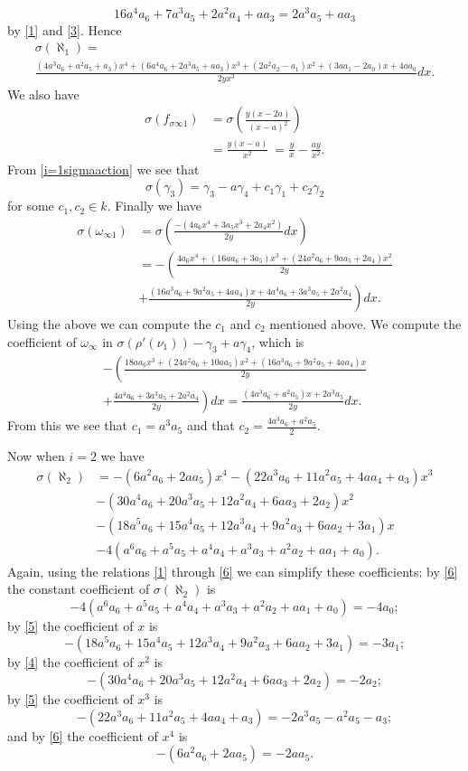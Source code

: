 \documentclass[draft, 11pt]{article} %
\theoremstyle{plain}
\theoremstyle{remark}
\begin{document}
\[
16a^4a_6+7a^3a_5+2a^2a_4+aa_3 = 2a^3a_5 +aa_3
\]
by \ref{1} and \ref{3}.
Hence
\begin{multline*}
\sigma(\aleph_1) = \\ \frac{(4a^3a_6+a^2a_5+a_3)x^4+(6a^4a_6+2a^3a_5+aa_3)x^3+(2a^2a_2-a_1)x^2+(3aa_1-2a_0)x+4aa_0}{2yx^3}dx.
\end{multline*}
We also have
\begin{align}\label{i=1sigmaaction}
\sigma(f_{\sigma \infty 1}) & = \sigma\left(\frac{y(x-2a)}{(x-a)^2} \right) \nonumber\\
& = \frac{y(x-a)}{x^2}  \
 = \frac{y}{x} - \frac{ay}{x^2}.
\end{align}
From \eqref{i=1sigmaaction} we see that
\begin{equation}\label{firstidentity}
\sigma(\gamma_3) = \gamma_3 - a\gamma_4 + c_1\gamma_1 + c_2 \gamma_2
\end{equation}
for some $c_1,c_2 \in k$.
Finally we have
\begin{align*}
\sigma (\omega_{\infty 1}) & = \sigma\left( \frac{-(4a_6x^4+3a_5x^3+2a_4x^2)}{2y} dx \right) \\
& = - \left( \frac{4a_6x^4+(16aa_6+3a_5)x^3+(24a^2a_6+9aa_5+2a_4)x^2}{2y}\right. \\ 
& \left. +\frac{(16a^3a_6+9a^2a_5+4aa_4)x+4a^4a_6+3a^3a_5+2a^2a_4}{2y}\right) dx.
\end{align*}
Using the above we can compute the $c_1$ and $c_2$ mentioned above.
We compute the coefficient of $\omega_{\infty}$ in $\sigma(\rho'(\nu_1)) - \gamma_3 + a\gamma_4$, which is
\begin{multline*}
 -\left( \frac{18aa_6x^3 +(24a^2a_6+10aa_5)x^2+(16a^3a_6+9a^2a_5+4aa_4)x}{2y} \right. \\
+ \left. \frac{4a^4a_6+3a^3a_5+2a^2a_4}{2y}\right) dx  = \frac{(4a^3a_6+a^2a_5)x +2a^3a_5}{2y}dx.
\end{multline*}
From this we see that $c_1= a^3a_5$ and that $c_2 = \frac{4a^3a_6+a^2a_5}{2}$.


Now when $i=2$ we have
\begin{align*}
\sigma(\aleph_2) & = -(6a^2a_6+2aa_5)x^4 - (22a^3a_6+11a^2a_5+4aa_4+a_3)x^3 \\
& - (30a^4a_6+20a^3a_5+12a^2a_4+6aa_3+2a_2)x^2 \\
& - (18a^5a_6+15a^4a_5+12a^3a_4+9a^2a_3+6aa_2+3a_1)x \\
& -4(a^6a_6+a^5a_5+a^4a_4+a^3a_3+a^2a_2+aa_1+a_0).
\end{align*}
Again, using the relations \ref{1} through \ref{6} we can simplify these coefficients:
by \ref{6} the constant coefficient of $\sigma(\aleph_2)$ is
\[
-4(a^6a_6+a^5a_5+a^4a_4+a^3a_3+a^2a_2+aa_1+a_0) = -4a_0;
\]
by \ref{5} the coefficient of $x$ is
\[
- (18a^5a_6+15a^4a_5+12a^3a_4+9a^2a_3+6aa_2+3a_1) = -3a_1;
\]
by \ref{4} the coefficient of $x^2$ is 
\[
- (30a^4a_6+20a^3a_5+12a^2a_4+6aa_3+2a_2) = -2a_2;
\]
by \ref{5} the coefficient of $x^3$ is
\[
- (22a^3a_6+11a^2a_5+4aa_4+a_3) = -2a^3a_5-a^2a_5-a_3;
\]
and by \ref{6} the coefficient of $x^4$ is
\[
-(6a^2a_6+2aa_5) = -2aa_5.
\]
\end{document}
